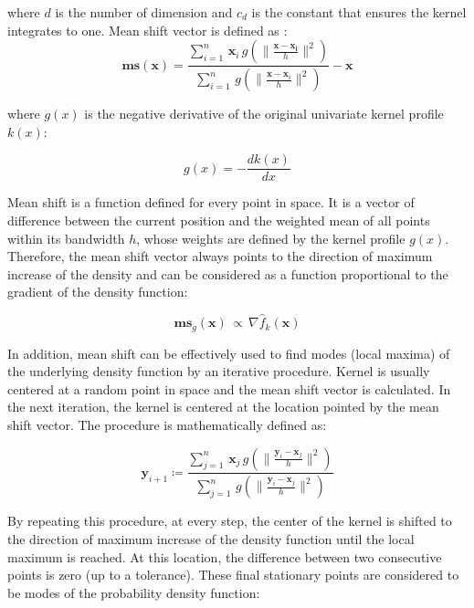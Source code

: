 where $d$ is the number of dimension and $c_d$ is the constant that ensures the kernel integrates to one.
Mean shift vector is defined as \citep{Comaniciu2002}:
\begin{equation} \label{eq:3-A8}
\mathbf{ms} (\mathbf{x}) = 
\frac{\sum_{i=1}^n \, \mathbf{x}_i \, g (\parallel  \frac{\mathbf{x}-\mathbf{x_i}}{h} \parallel^2) }{\sum_{i=1}^n \, g (\parallel  \frac{\mathbf{x}-\mathbf{x}_i}{h} \parallel^2)} - \mathbf{x}
\end{equation}

where $g(x)$ is the negative derivative of the original univariate kernel profile $k(x)$:

\begin{equation} \label{eq:3-A9}
g(x) = - \frac{dk(x)}{dx}
\end{equation}

Mean shift is a function defined for every point in space. It is a vector of difference between the current position and the weighted mean of all points within its bandwidth $h$, whose weights are defined by the kernel profile $g(x)$. Therefore, the mean shift vector always points to the direction of maximum increase of the density and can be considered as a function proportional to the gradient of the density function:

\begin{equation} \label{eq:3-A10}
\mathbf{ms}_g (\mathbf{x}) \, \propto \, \nabla \hat{f}_k (\mathbf{x})
\end{equation}

In addition, mean shift can be effectively used to find modes (local maxima) of the underlying density function by an iterative procedure. Kernel is usually centered at a random point in space and the mean shift vector is calculated. In the next iteration, the kernel is centered at the location pointed by the mean shift vector. The procedure is mathematically defined as:

\begin{equation} \label{eq:3-A11}
\mathbf{y}_{i+1} \coloneqq 
\frac{\sum_{j=1}^n \, \mathbf{x}_j \, g (\parallel \frac{\mathbf{y}_i-\mathbf{x}_j}{h} \parallel^2) }
{\sum_{j=1}^n \, g (\parallel  \frac{\mathbf{y}_i-\mathbf{x}_j}{h} \parallel^2)}
\end{equation}

By repeating this procedure, at every step, the center of the kernel is shifted to the direction of maximum increase of the density function until the local maximum is reached. At this location, the difference between two consecutive points is zero (up to a tolerance). These final stationary points are considered to be modes of the probability density function:

